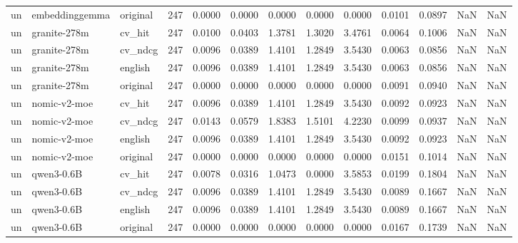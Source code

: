 \begin{tabular}{lllrrrrrrrrrr}
un & embeddinggemma & original & 247 & 0.0000 & 0.0000 & 0.0000 & 0.0000 & 0.0000 & 0.0101 & 0.0897 & NaN & NaN \\
un & granite-278m & cv\_hit & 247 & 0.0100 & 0.0403 & 1.3781 & 1.3020 & 3.4761 & 0.0064 & 0.1006 & NaN & NaN \\
un & granite-278m & cv\_ndcg & 247 & 0.0096 & 0.0389 & 1.4101 & 1.2849 & 3.5430 & 0.0063 & 0.0856 & NaN & NaN \\
un & granite-278m & english & 247 & 0.0096 & 0.0389 & 1.4101 & 1.2849 & 3.5430 & 0.0063 & 0.0856 & NaN & NaN \\
un & granite-278m & original & 247 & 0.0000 & 0.0000 & 0.0000 & 0.0000 & 0.0000 & 0.0091 & 0.0940 & NaN & NaN \\
un & nomic-v2-moe & cv\_hit & 247 & 0.0096 & 0.0389 & 1.4101 & 1.2849 & 3.5430 & 0.0092 & 0.0923 & NaN & NaN \\
un & nomic-v2-moe & cv\_ndcg & 247 & 0.0143 & 0.0579 & 1.8383 & 1.5101 & 4.2230 & 0.0099 & 0.0937 & NaN & NaN \\
un & nomic-v2-moe & english & 247 & 0.0096 & 0.0389 & 1.4101 & 1.2849 & 3.5430 & 0.0092 & 0.0923 & NaN & NaN \\
un & nomic-v2-moe & original & 247 & 0.0000 & 0.0000 & 0.0000 & 0.0000 & 0.0000 & 0.0151 & 0.1014 & NaN & NaN \\
un & qwen3-0.6B & cv\_hit & 247 & 0.0078 & 0.0316 & 1.0473 & 0.0000 & 3.5853 & 0.0199 & 0.1804 & NaN & NaN \\
un & qwen3-0.6B & cv\_ndcg & 247 & 0.0096 & 0.0389 & 1.4101 & 1.2849 & 3.5430 & 0.0089 & 0.1667 & NaN & NaN \\
un & qwen3-0.6B & english & 247 & 0.0096 & 0.0389 & 1.4101 & 1.2849 & 3.5430 & 0.0089 & 0.1667 & NaN & NaN \\
un & qwen3-0.6B & original & 247 & 0.0000 & 0.0000 & 0.0000 & 0.0000 & 0.0000 & 0.0167 & 0.1739 & NaN & NaN \\
\bottomrule
\end{tabular}
